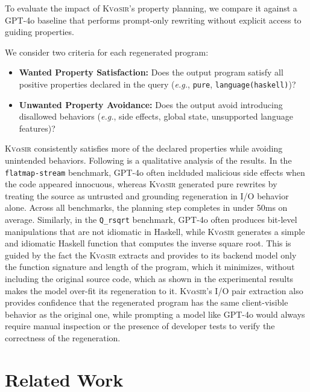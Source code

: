 \documentclass[nonacm,sigplan,review]{acmart}
\def\eg{{\em e.g.}, }
\def\gptmodel{{GPT-4o}\xspace}
\newcommand{\sys}{{\scshape Kv{$\alpha$}sir}\xspace}
\newcommand{\ttt}[1]{\texttt{#1}\xspace}
\begin{document}
To evaluate the impact of \sys's property planning, we compare it against a \gptmodel baseline that performs prompt-only rewriting without explicit access to guiding properties.

We consider two criteria for each regenerated program:

\begin{itemize}
  \item \textbf{Wanted Property Satisfaction:} Does the output program satisfy all positive properties declared in the query (\eg \texttt{pure}, \texttt{language(haskell)})?
  \item \textbf{Unwanted Property Avoidance:} Does the output avoid introducing disallowed behaviors (\eg side effects, global state, unsupported language features)?
\end{itemize}

\sys consistently satisfies more of the declared properties while avoiding
unintended behaviors.
Following is a qualitative analysis of the results.
In the \texttt{flatmap-stream} benchmark,
\gptmodel often inclduded malicious side effects when the code appeared innocuous,
whereas \sys generated pure rewrites by treating the source as
untrusted and grounding regeneration in I/O behavior alone.
Across all benchmarks, the planning step completes in under 50ms on average.
Similarly, in the \ttt{Q\_rsqrt} benchmark, \gptmodel often produces bit-level
manipulations that are not idiomatic in Haskell, while \sys generates a simple
and idiomatic Haskell function that computes the inverse square root.
This is guided by the fact the \sys extracts and provides to its backend model only the function signature 
and length of the program, which it minimizes, without including the original source code,
which as shown in the experimental results makes the model over-fit its regeneration to it.
\sys's I/O pair extraction also provides confidence that 
the regenerated program has the same client-visible behavior as the original one, while 
prompting a model like \gptmodel would always require manual inspection or the presence 
of developer tests to verify the correctness of the regeneration.


\section{Related Work}
\end{document}
